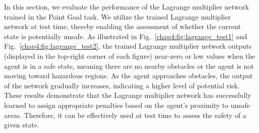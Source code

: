 In this section, we evaluate the performance of the Lagrange multiplier network trained in the Point Goal task.
We utilize the trained Lagrange multiplier network at test time, thereby enabling the assessment of whether the current state is potentially unsafe.
As illustrated in Fig.~\ref{chap4:fig:lagrange_test1} and Fig.~\ref{chap4:fig:lagrange_test2}, the trained Lagrange multiplier network outputs (displayed in the top-right corner of each figure) near-zero or low values when the agent is in a safe state, meaning there are no nearby obstacles or the agent is not moving toward hazardous regions.
As the agent approaches obstacles, the output of the network gradually increases, indicating a higher level of potential risk.
These results demonstrate that the Lagrange multiplier network has successfully learned to assign appropriate penalties based on the agent’s proximity to unsafe areas.
Therefore, it can be effectively used at test time to assess the safety of a given state.

